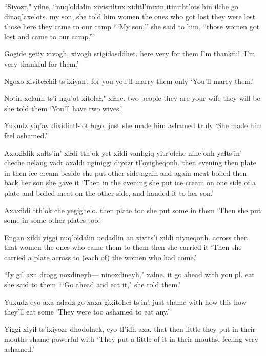 \documentclass[12pt]{article}
\begin{document}
\gll ``Siyozr," yiɬne, ``nuq'oɬdaɬin {xivisriɬtux xiditl'inixin} itinitht'ots hin   ilche go   dinaq'axe'ots.
 {my son,} {she told him} women       {the ones who got lost}    {they were lost} {those} {}    here {they came to our camp}
\glt ```My son,'' she said to him, ``those women got lost and came to our camp.'''
\glend

\gll Gogide getiy xivogh, xivogh   srigidasddhet.
here   very  {for them} {} {I'm thankful}
\glt `I'm very thankful for them.'
\glend

\gll Ngoxo   xiviteɬchiɬ       ts'ixiyan'.
{for you} {you'll marry them} only
\glt `You'll marry them.'
\glend

\gll Notin      xelanh   ts'i ngu'ot    xitolaɬ,"    xiɬne.
{two people} {they are}  {}    {your wife} {they will be} {she told them}
\glt `You'll have two wives.'
\glend

\gll Yuxudz {yiq'ay dixidintl-'ot} ɬogo.
just   {she made him ashamed} truly
\glt `She made him feel ashamed.'
\glend

\gll Axaxiɬdik xaɬts'in' xiɬdi tth'ok yet xiɬdi vanhgiq yitr'oɬche nine'onh yaɬts'in' cheche nelang vadr   axaɬdi nginiggi diyozr  tl'oyigheqonh.
then      evening   then  plate  in  then  {ice cream} beside     {she put}   {other side} {again and again} meat   boiled then     back    {her son} {she gave it }
\glt `Then in the evening she put ice cream on one side of a plate and boiled meat on the other side, and handed it to her son.'
\glend

\gll Axaxiɬdi tth'ok che yegighelo.
then     plate  too {she put some in them}
\glt `Then she put some in some other plates too.'
\glend

\gll Engan  xiɬdi yiggi nuq'oɬdaɬin nedadlin  an   xivits'i xiɬdi niyneqonh.
across then  that  women       {the ones who came} them {to them} then {she carried it}
\glt `Then she carried a plate across to (each of) the women who had come.'
\glend

\gll ``Iy gil axa {drogg noxdineyh--- ninoxdineyh,"} xaɬne.
 it {go ahead}  with {you pl. eat}         {she said to them}
\glt ```Go ahead and eat it," she told them.'
\glend

\gll Yuxudz eyo   axa  ndadz go   xaxa gixitoheɬ ts'in'.
just   shame with how   this how  {they'll eat some}
\glt `They were too ashamed to eat any.'
\glend

\gll Yiggi xiyiɬ ts'ixiyozr dhodolnek, eyo   tl'idh axa.
that then  little     {they put in their mouths}  shame powerful with
\glt `They put a little of it in their mouths, feeling very ashamed.'
\glend
\end{document}

